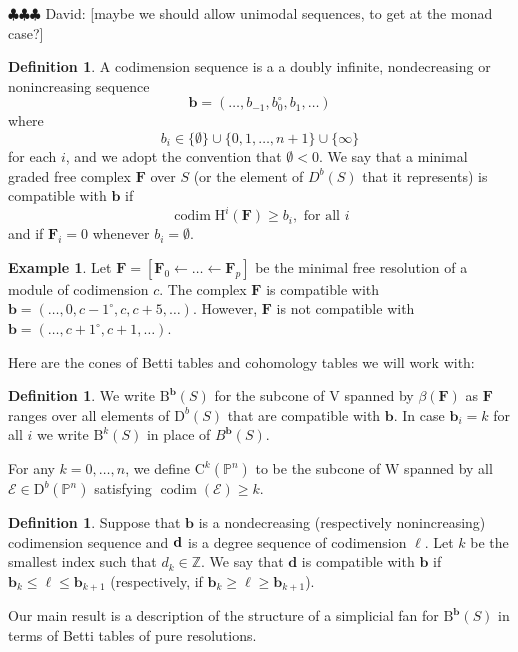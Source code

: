 \documentclass[12pt]{amsart}
\theoremstyle{definition}
\newtheorem{example}[lemma]{Example}
\newtheorem{defn}[lemma]{Definition}
\theoremstyle{remark}
\newcommand{\codim}{\operatorname{codim}}
\newcommand{\PP}{\mathbb{P}}
\newcommand{\HH}{\mathrm{H}}
\newcommand{\ZZ}{\mathbb{Z}}
\newcommand{\VV}{\mathrm{V}}
\newcommand{\WW}{\mathrm{W}}
\newcommand{\bb}{\mathbf{b}}
\newcommand{\dd}{\mathbf{d}}
\newcommand{\cE}{\mathcal{E}}
\newcommand{\FF}{\mathbf{F}}
\newcommand{\defi}[1]{\textsf{#1}} %
\newcommand{\DD}{\mathrm{D}}
\newcommand{\CQ}{\mathrm{C}}
\newcommand{\BBQ}{\mathrm{B}}
\newcommand{\david}[1]{{\color{red} \sf $\clubsuit\clubsuit\clubsuit$ David: [#1]}}
\begin{document}
\david{maybe we should allow unimodal sequences, to get at the monad case?}
\begin{defn} A \defi{codimension sequence} is a
a doubly infinite, nondecreasing or nonincreasing sequence 
$$
\bb=(\dots, b_{-1}, b_{0}^{\circ}, b_{1}, \dots )
$$
where  
$$
b_{i}\in \{\emptyset\} \cup \{0,1,\dots,n+1\}\cup \{\infty\}
$$
for each $i$, and we adopt the convention that $\emptyset<0$.   We say that a
minimal graded free complex $\FF$ over $S$ (or the element of $D^{b}(S)$ that it represents) is \defi{compatible with $\bb$} if 
\[
\codim \HH^i(\FF) \geq b_i, \text{ for all } i
\]
and if $\FF_i=0$ whenever $b_i=\emptyset$.
\end{defn}

\begin{example}
Let $\FF=[\FF_0\gets \dots \gets \FF_p]$ be the minimal free resolution of a module of codimension $c$.  The complex $\FF$ is compatible with $\bb=(\dots, 0,c-1^\circ,c,c+5,\dots)$.  However, $\FF$ is not compatible with $\bb=(\dots,c+1^\circ,c+1,\dots)$.  
\end{example}

Here are the cones of Betti tables and cohomology tables we will work with:
\begin{defn}\label{defn:cones}
We write $\BBQ^{\bb}(S)$ for the subcone of $\VV$ spanned by $\beta(\FF)$ as $\FF$ ranges over all elements of $\DD^b(S)$ that are compatible with $\bb$.  In case  $\bb_i=k$ for all $i$ we write $\BBQ^k(S)$ in place of $B^{\bb}(S)$.

For any $k=0, \dots, n$, we define $\CQ^k(\PP^n)$ to be the subcone of $\WW$ spanned by all $\cE\in \DD^b(\PP^n)$ satisfying $\codim(\cE)\geq k$.
\end{defn}

\begin{defn}\label{defn:deg compatible}
Suppose that $\bb$ is a nondecreasing (respectively nonincreasing) codimension sequence 
and ${\bf d}$ is a degree sequence  of codimension $\ell$. Let $k$ be the smallest index
such that $d_{k}\in \ZZ$. We say that $\dd$ is \defi{compatible with $\bb$} if $\bb_k\leq \ell\leq \bb_{k+1}$  (respectively, if $\bb_k\geq \ell\geq \bb_{k+1}$).
\end{defn}

Our main result is a description of the structure of a simplicial fan for $\BBQ^{\bb}(S)$ in terms of  Betti tables of pure resolutions.  
\end{document}
